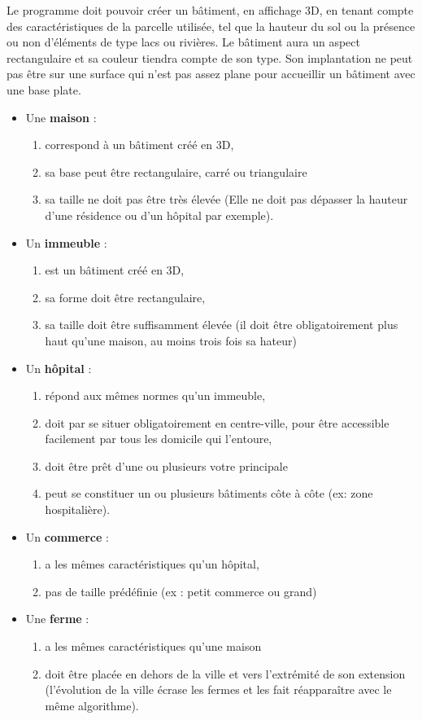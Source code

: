 {
Le programme doit pouvoir créer un bâtiment, en affichage 3D, en tenant compte des caractéristiques de la parcelle utilisée, tel que la hauteur du sol ou la présence ou non d'éléments de type lacs ou rivières. Le bâtiment aura un aspect rectangulaire et sa couleur tiendra compte de son type. Son implantation ne peut pas être sur une surface qui n’est pas assez plane pour accueillir un bâtiment avec une base plate.

\begin{itemize}
	\item Une \textbf{maison} : 
		\begin{enumerate}
			\item correspond à un bâtiment créé en 3D,
			\item sa base peut être rectangulaire, carré ou triangulaire
		    \item sa taille ne doit pas être très élevée (Elle ne doit pas dépasser la hauteur d’une résidence ou d’un hôpital par exemple). 
		\end{enumerate}
	\item Un \textbf{immeuble} :
		\begin{enumerate} 
			\item est un bâtiment créé en 3D, 
			\item sa forme doit être rectangulaire, 
			\item sa taille doit être suffisamment élevée (il doit être obligatoirement plus haut qu’une maison, au moins trois fois sa hateur)
		\end{enumerate}
	\item Un \textbf{hôpital} : 
	    \begin{enumerate}
		    \item répond aux mêmes normes qu’un immeuble, 
			\item doit par se situer obligatoirement en centre-ville, pour être accessible facilement par tous les domicile qui l’entoure,
			\item doit être prêt d’une ou plusieurs votre principale
		    \item 	peut se constituer un ou plusieurs bâtiments côte à côte (ex: zone hospitalière).
		\end{enumerate}
	\item Un \textbf{commerce} :
		\begin{enumerate}
			\item a les mêmes caractéristiques qu’un hôpital, 
			\item pas de taille prédéfinie (ex : petit commerce ou grand) 
		\end{enumerate}
	\item Une \textbf{ferme} :
		\begin{enumerate}
			\item a les mêmes caractéristiques qu'une maison
			\item doit être placée en dehors de la ville et vers l'extrémité de son extension (l'évolution de la ville écrase les fermes et les fait réapparaître avec le même algorithme).
		\end{enumerate}
\end{itemize}
}
